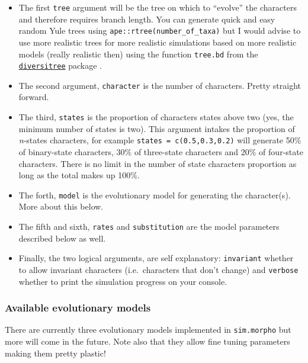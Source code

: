 \documentclass[]{book}
\providecommand{\tightlist}{%
  \setlength{\itemsep}{0pt}\setlength{\parskip}{0pt}}
\begin{document}
\begin{itemize}
\tightlist
\item
  The first \texttt{tree} argument will be the tree on which to ``evolve'' the characters and therefore requires branch length.
  You can generate quick and easy random Yule trees using \texttt{ape::rtree(number\_of\_taxa)} but I would advise to use more realistic trees for more realistic simulations based on more realistic models (really realistic then) using the function \texttt{tree.bd} from the \href{http://www.zoology.ubc.ca/prog/diversitree/}{\texttt{diversitree}} package \citep{fitzjohndiversitree2012}.
\item
  The second argument, \texttt{character} is the number of characters. Pretty straight forward.
\item
  The third, \texttt{states} is the proportion of characters states above two (yes, the minimum number of states is two). This argument intakes the proportion of \emph{n}-states characters, for example \texttt{states\ =\ c(0.5,0.3,0.2)} will generate 50\% of binary-state characters, 30\% of three-state characters and 20\% of four-state characters. There is no limit in the number of state characters proportion as long as the total makes up 100\%.
\item
  The forth, \texttt{model} is the evolutionary model for generating the character(s). More about this below.
\item
  The fifth and sixth, \texttt{rates} and \texttt{substitution} are the model parameters described below as well.
\item
  Finally, the two logical arguments, are self explanatory: \texttt{invariant} whether to allow invariant characters (i.e.~characters that don't change) and \texttt{verbose} whether to print the simulation progress on your console.
\end{itemize}

\hypertarget{available-evolutionary-models}{%
\subsubsection{Available evolutionary models}\label{available-evolutionary-models}}

There are currently three evolutionary models implemented in \texttt{sim.morpho} but more will come in the future.
Note also that they allow fine tuning parameters making them pretty plastic!
\end{document}
